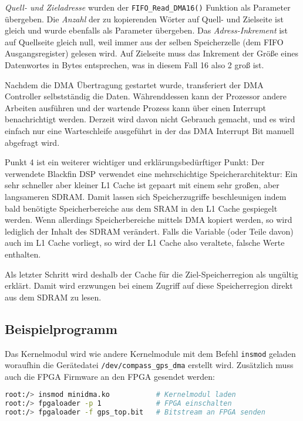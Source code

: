 \emph{Quell- und Zieladresse} wurden der \lstinline$FIFO_Read_DMA16()$ Funktion als Parameter übergeben. Die \emph{Anzahl} der zu kopierenden Wörter auf Quell- und Zielseite ist gleich und wurde ebenfalls als Parameter übergeben. Das \emph{Adress-Inkrement} ist auf Quellseite gleich null, weil immer aus der selben Speicherzelle (dem FIFO Ausgangsregister) gelesen wird. Auf Zielseite muss das Inkrement der Größe eines Datenwortes in Bytes entsprechen, was in diesem Fall \SI{16}{\bit} also \SI{2}{\byte} groß ist.

Nachdem die DMA Übertragung gestartet wurde, transferiert der DMA Controller selbstständig die Daten. Währenddessen kann der Prozessor andere Arbeiten ausführen und der wartende Prozess kann über einen Interrupt benachrichtigt werden. Derzeit wird davon nicht Gebrauch gemacht, und es wird einfach nur eine Warteschleife ausgeführt in der das DMA Interrupt Bit manuell abgefragt wird.

Punkt 4 ist ein weiterer wichtiger und erklärungsbedürftiger Punkt: Der verwendete Blackfin DSP verwendet eine mehrschichtige Speicherarchitektur: Ein sehr schneller aber kleiner L1 Cache ist gepaart mit einem sehr großen, aber langsameren SDRAM. Damit lassen sich Speicherzugriffe beschleunigen indem bald benötigte Speicherbereiche aus dem SRAM in den L1 Cache gespiegelt werden. Wenn allerdings Speicherbereiche mittels DMA kopiert werden, so wird lediglich der Inhalt des SDRAM verändert. Falls die Variable (oder Teile davon) auch im L1 Cache vorliegt, so wird der L1 Cache also veraltete, falsche Werte enthalten.

Als letzter Schritt wird deshalb der Cache für die Ziel-Speicherregion als ungültig erklärt. Damit wird erzwungen bei einem Zugriff auf diese Speicherregion direkt aus dem SDRAM zu lesen.


\subsection{Beispielprogramm}
Das Kernelmodul wird wie andere Kernelmodule mit dem Befehl \lstinline$insmod$ geladen woraufhin die Gerätedatei \lstinline$/dev/compass_gps_dma$ erstellt wird. Zusätzlich muss auch die FPGA Firmware an den FPGA gesendet werden:
\begin{lstlisting}[language=bash, deletekeywords={if}]
root:/> insmod minidma.ko           # Kernelmodul laden
root:/> fpgaloader -p 1             # FPGA einschalten
root:/> fpgaloader -f gps_top.bit   # Bitstream an FPGA senden
\end{lstlisting}

